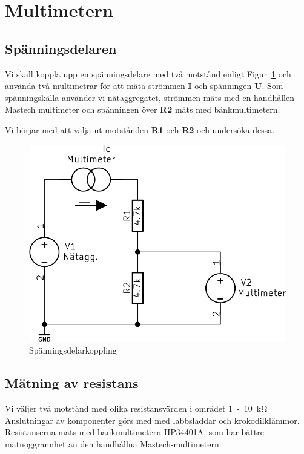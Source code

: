 \documentclass[11pt,a4paper]{article}
\begin{document}
\section{Multimetern}\label{}

\subsection{Spänningsdelaren}\label{vdiv1}
Vi skall koppla upp en spänningsdelare med två motstånd enligt 
Figur~\ref{fig:2-mm-schem} och använda två multimetrar för att mäta strömmen 
\textbf{I} och spänningen \textbf{U}. Som spänningskälla använder vi 
nätaggregatet, strömmen mäts med en handhållen Mastech multimeter och spänningen
över \textbf{R2} mäts med bänkmultimetern.
\par Vi börjar med att välja ut motstånden \textbf{R1} och \textbf{R2} och 
undersöka dessa.

\begin{figure}[htbp]
    \centering
        \includegraphics[scale=0.5]{kicad/2-multimeter-schema.png}
    \caption{Spänningsdelarkoppling}
    \label{fig:2-mm-schem}
\end{figure}


\subsection{Mätning av resistans}\label{vdiv2}
Vi väljer två motstånd med olika resistansvärden i området \si{1-10\kohm}
Anslutningar av komponenter görs med med labbsladdar och krokodilklämmor.
Resistanserna mäts med bänkmultimetern HP34401A, som har bättre mätnoggrannhet
än den handhållna Mastech-multimetern. 
\end{document}
